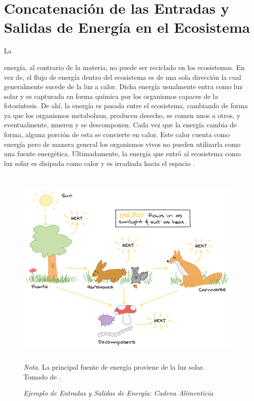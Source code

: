 \documentclass[stu, 12pt, letterpaper, donotrepeattitle, floatsintext, natbib]{apa7}
\begin{document}
\section{Concatenación de las Entradas y Salidas de Energía en el Ecosistema}
La \begin{justifying}
    energía, al contrario de la materia, no puede ser reciclado en los ecosistemas. En vez de, el flujo de energía dentro del ecosistema es de una sola dirección la cual generalmente sucede de la luz a calor.
    Dicha energía usualmente entra como luz solar y es capturada en forma química por los organismos capaces de la fotosíntesis. De ahí, la energía es pasada entre el ecosistema, cambiando de forma ya que los organismos
    metabolzan, producen desecho, se comen unos a otros, y eventualmente, mueren y se descomponen.
    Cada vez que la energía cambia de forma, alguna porción de esta se convierte en calor. Este calor cuenta como energía pero de manera general los organismos vivos no pueden utilizarla como una fuente energética. Ultimadamente,
    la energía que entró al ecosistema como luz solar es disipada como calor y es irradiada hacia el espacio \citep{khan-academy-no-date}.\par
\end{justifying}
\vspace{\baselineskip}
\begin{figure}[H]
    \caption{\emph{Ejemplo de Entradas y Salidas de Energía: Cadena Alimenticia}}
    \centering
    \includegraphics[width=14cm,height=10cm]{evenflow.png}
    \bigskip
        \\\small\textit{Nota}. La principal fuente de energía proviene de la luz solar. Tomado de \cite{khan-academy-no-date}. %
\end{figure}
\end{document}
